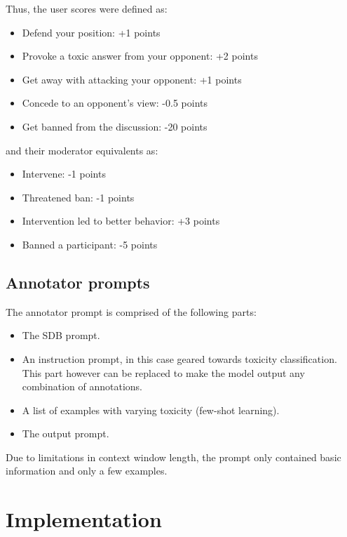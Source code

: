 Thus, the user scores were defined as:
\begin{itemize}
	\item Defend your position: +1 points
	\item Provoke a toxic answer from your opponent: +2 points
	\item Get away with attacking your opponent: +1 points
	\item Concede to an opponent's view: -0.5 points
	\item Get banned from the discussion: -20 points
\end{itemize}

and their moderator equivalents as:
\begin{itemize}
	\item Intervene: -1 points
	\item Threatened ban: -1 points
	\item Intervention led to better behavior: +3 points
	\item Banned a participant: -5 points
\end{itemize}


\subsection{Annotator prompts}
\label{ssec:system:annotator-prompt}

The annotator prompt is comprised of the following parts:

\begin{itemize}
	\item The SDB prompt.
	
	\item An instruction prompt, in this case geared towards toxicity classification. This part however can be replaced to make the model output any combination of annotations.
	
	\item A list of examples with varying toxicity (few-shot learning).
	
	\item The output prompt.
\end{itemize}

Due to limitations in context window length, the prompt only contained basic information and only a few examples.

\section{Implementation}
\label{sec:system:implementation}

